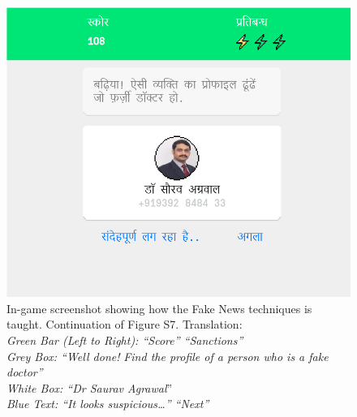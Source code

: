 \documentclass[empirical, authordate, issue]{jote-new-article}
\begin{document}
\begin{figure}
  \includegraphics[width=\linewidth]{media/supplement/images8.jpeg}
  \caption{
    In-game screenshot showing how the Fake News techniques is taught. Continuation of Figure S7.
    Translation:\\
    \emph{Green Bar (Left to Right): “Score” “Sanctions”}\\
    \emph{Grey Box: “Well done! }\emph{Find the profile of a person who is a fake doctor”}\\
    \emph{White Box: “Dr Saurav Agrawal}”\\
    \emph{Blue Text: “It looks suspicious…” “Next”}\\
  }
  \label{fig:figS8}
\end{figure}
\end{document}
